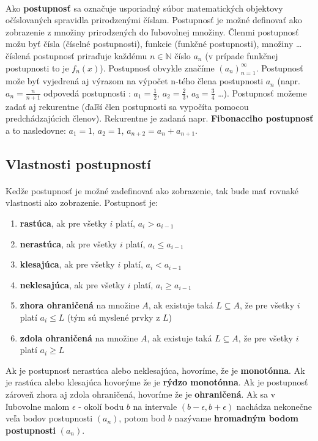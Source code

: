 \documentclass[12pt,a4paper]{article}
\begin{document}
\paragraph{}
Ako \textbf{postupnosť} sa označuje usporiadný súbor matematických objektovy očíslovaných spravidla prirodzenými číslam. Postupnosť je možné definovať  ako zobrazenie z množiny prirodzených do ľubovolnej množiny. Členmi postupnosť možu byť čísla (číselné postupnosti), funkcie (funkčné postupnosti), množiny \dots číslená postupnosť priraďuje každému $n\in \mathds{N}$ číslo $a_{n}$ (v prípade funkčnej postupnosti to je $f_{n}(x)$). Postupnosť obvykle značíme $(a_{n})_{n=1}^{\infty}$. Postupnosť može byť vyjedrená aj výrazom na výpočet n-tého člena postupnosti $a_{n}$ (napr. $a_{n}=\frac{n}{n+1}$ odpovedá postupnosti : $a_{1}=\frac{1}{2}$, $a_{2}=\frac{2}{3}$, $a_{3}=\frac{3}{4}$ \dots). Postupnosť možeme zadať aj rekurentne (ďaľší člen postupnosti sa vypočíta pomocou predchádzajúcich členov). Rekurentne je zadaná napr. \textbf{Fibonacciho postupnosť} a to nasledovne: $a_{1}=1$, $a_{2}=1$, $a_{n+2}=a_{n}+a_{n+1}$.

\subsection{Vlastnosti postupností}
\paragraph{}
Kedže postupnosť je možné zadefinovať ako zobrazenie, tak bude mať rovnaké vlastnosti ako zobrazenie. Postupnosť je:
\begin{enumerate}
	\item \textbf{rastúca}, ak pre všetky $i$ platí, $a_{i}>a_{i-1}$
	\item \textbf{nerastúca}, ak pre všetky $i$ platí, $a_{i}\leq a_{i-1}$
	\item \textbf{klesajúca}, ak pre všetky $i$ platí, $a_{i}<a_{i-1}$
	\item \textbf{neklesajúca}, ak pre všetky $i$ platí, $a_{i}\geq a_{i-1}$
	\item \textbf{zhora ohraničená} na množine $A$, ak existuje taká $L\subseteq A$, že pre všetky $i$ platí $a_{i}\leq L$ (tým sú myslené prvky z $L$)
	\item \textbf{zdola ohraničená} na množine $A$, ak existuje taká $L\subseteq A$, že pre všetky $i$ platí $a_{i}\geq L$	
\end{enumerate}

Ak je postupnosť nerastúca alebo neklesajúca, hovoríme, že je \textbf{monotónna}. Ak je rastúca alebo klesajúca hovorýme že je \textbf{rýdzo monotónna}. Ak je postupnosť zároveň zhora aj zdola ohraničená, hovoríme že je \textbf{ohraničená}. Ak sa v ľubovolne malom $\epsilon$ - okolí bodu $b$ na intervale $(b-\epsilon , b+\epsilon )$ nachádza nekonečne veľa bodov postupnosti $(a_{n})$, potom bod $b$ nazývame \textbf{hromadným bodom postupnosti} $(a_{n})$.
\end{document}
